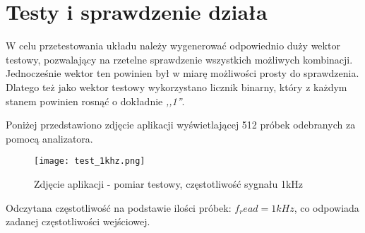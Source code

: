 \section{Testy i sprawdzenie działa}
    W celu przetestowania układu należy wygenerować odpowiednio duży wektor testowy,
    pozwalający na rzetelne sprawdzenie wszystkich możliwych kombinacji.
    Jednocześnie wektor ten powinien był w miarę możliwości prosty do sprawdzenia.
    Dlatego też jako wektor testowy wykorzystano licznik binarny, który z każdym stanem powinien rosnąć o dokładnie \textit{,,1''}.

    Poniżej przedstawiono zdjęcie aplikacji wyświetlającej 512 próbek odebranych za pomocą analizatora.
    \begin{figure}[!ht]
        \centering
        \texttt{[image: test\_1khz.png]}
        \caption{Zdjęcie aplikacji - pomiar testowy, częstotliwość sygnału 1kHz}
    \end{figure}

    Odczytana częstotliwość na podstawie ilości próbek: $f_read = 1kHz$, co odpowiada zadanej częstotliwości wejściowej.